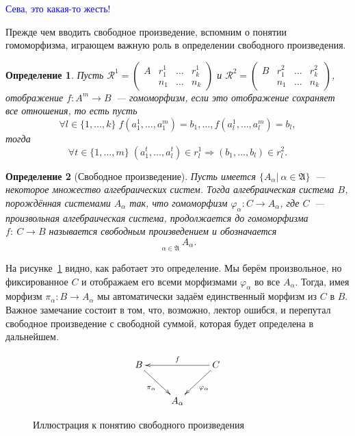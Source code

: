 \documentclass[a4paper, 12pt]{report}
\newtheorem{definition}{Определение}[chapter]
\begin{document}
\textcolor{blue}{Сева, это какая-то жесть!}

Прежде чем вводить свободное произведение, вспомним о понятии гомоморфизма, играющем важную роль в определении свободного произведения.

\begin{definition}
Пусть
$
\mathcal{R}^1 =
\begin{pmatrix}
A & r_1^1 & \ldots & r_k^1\\
  & n_1 & \ldots & n_k
\end{pmatrix}
$
и
$
\mathcal{R}^2 =
\begin{pmatrix}
B & r_1^2 & \ldots & r_k^2\\
  & n_1 & \ldots & n_k
\end{pmatrix}
$, отображение $f: A^m \rightarrow B$~--- гомоморфизм, если это отображение сохраняет все отношения, то есть пусть
\[
\forall l \in \{1, \ldots, k \} \; f(a_1^1, \ldots, a_1^m) = b_1, \ldots, f(a^1_l, \ldots, a_l^m) = b_l,
\]
тогда
\[
\forall t \in \{ 1,\ldots,m\} \; (a_1^t, \ldots, a_l^t) \in r_l^1 \Rightarrow (b_1, \ldots, b_l) \in r^2_l.
\]
\end{definition}

\begin{definition}[Свободное произведение]
Пусть имеется $\{A_{\alpha}|\ \alpha\in\mathfrak{A}\}$~--- некоторое множество алгебраических систем. Тогда алгебраическая система $B$, порождённая системами $A_{\alpha}$ так, что гомоморфизм $\varphi_{\alpha}: C \rightarrow A_{\alpha}$, где $C$~--- произвольная алгебраическая система, продолжается до гомоморфизма $f:\ C\rightarrow B$ называется свободным произведением и обозначается
\[
\mathop{\textstyle{\prod^*}}\limits_{\alpha\in\mathfrak{A}} A_{\alpha}.
\]
\end{definition}


На рисунке~\ref{fig::free_prod} видно, как работает это определение. Мы берём произвольное, но фиксированное $C$ и отображаем его всеми морфизмами $\varphi_{\alpha}$ во все $A_{\alpha}$. Тогда, имея морфизм $\pi_{\alpha}: B\rightarrow A_{\alpha}$ мы автоматически задаём единственный морфизм из $C$ в $B$. Важное замечание состоит в том, что, возможно, лектор ошибся, и перепутал свободное произведение с свободной суммой, которая будет определена в дальнейшем.

\begin{figure}[!h]
\begin{equation*}
\xymatrix{
B\ar[rd]_{\pi_{\alpha}} & & \ar[ll]_f C\ar[ld]^{\varphi_{\alpha}}\\
 & A_{\alpha} &
}
\end{equation*}
\caption{Иллюстрация к понятию свободного произведения}
\label{fig::free_prod}
\end{figure}
\end{document}
